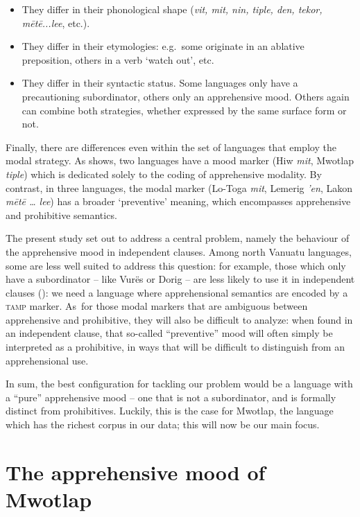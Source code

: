\documentclass[output=paper,colorlinks,citecolor=brown]{langscibook}
\begin{document}
\begin{itemize}
    \item They differ in their phonological shape (\textit{vit, mit, nin, tiple, den, tekor, mētē...lee}, etc.).
    \item They differ in their etymologies: e.g.\ some originate in an ablative preposition, others in a verb `watch out', etc.
    \item They differ in their syntactic status. Some languages only have a precautioning subordinator, others only an apprehensive mood. Others again can combine both strategies, whether expressed by the same surface form or not.
\end{itemize}

Finally, there are differences even within the set of languages that employ the modal strategy. As  shows, two languages have a mood marker (Hiw \textit{mit}, Mwotlap \textit{tiple}) which is dedicated solely to the coding of apprehensive modality. By contrast, in three languages, the modal marker (Lo-Toga \textit{mit}, Lemerig \textit{'en}, Lakon \textit{mētē {\ldots} lee}) has a broader `preventive' meaning, which encompasses apprehensive and prohibitive semantics.

The present study set out to address a central problem, namely the behaviour of the apprehensive mood in independent clauses. Among north Vanuatu languages, some are less well suited to address this question: for example, those which only have a subordinator -- like Vurës or Dorig -- are less likely to use it in independent clauses (): we need a language where apprehensional semantics are encoded by a \textsc{tamp} marker. As~for those modal markers that are ambiguous between apprehensive and prohibitive, they will also be difficult to analyze: when found in an independent clause, that so-called ``preventive'' mood will often simply be interpreted as a prohibitive, in ways that will be difficult to distinguish from an apprehensional use.

In sum, the best configuration for tackling our problem would be a language with a ``pure'' apprehensive mood -- one that is not a subordinator, and is formally distinct from prohibitives. Luckily, this is the case for Mwotlap, the language which has the richest corpus in our data; this will now be our main focus.




\section{The apprehensive mood of Mwotlap}
\label{sec:moodmwotlap}
\end{document}
